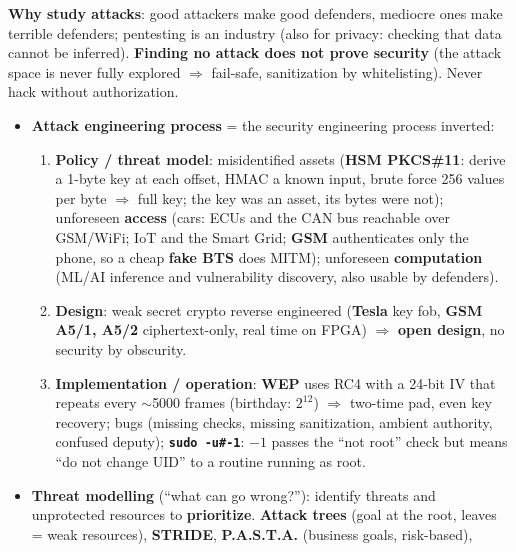 \begin{recapbox}[title={Exam-ready recap --- Lecture 8: Adversarial thinking I}]
\textbf{Why study attacks}: good attackers make good defenders, mediocre ones make terrible
defenders; pentesting is an industry (also for privacy: checking that data cannot be inferred).
\textbf{Finding no attack does not prove security} (the attack space is never fully explored
$\Rightarrow$ fail-safe, sanitization by whitelisting). Never hack without authorization.
\begin{itemize}
  \item \textbf{Attack engineering process} = the security engineering process inverted:
        \begin{enumerate}
          \item \textbf{Policy / threat model}: misidentified assets (\textbf{HSM PKCS\#11}: derive
                a 1-byte key at each offset, HMAC a known input, brute force 256 values per byte
                $\Rightarrow$ full key; the key was an asset, its bytes were not); unforeseen
                \textbf{access} (cars: ECUs and the CAN bus reachable over GSM/WiFi; IoT and the
                Smart Grid; \textbf{GSM} authenticates only the phone, so a cheap \textbf{fake
                BTS} does MITM); unforeseen \textbf{computation} (ML/AI inference and vulnerability
                discovery, also usable by defenders).
          \item \textbf{Design}: weak secret crypto reverse engineered (\textbf{Tesla} key fob,
                \textbf{GSM A5/1, A5/2} ciphertext-only, real time on FPGA) $\Rightarrow$
                \textbf{open design}, no security by obscurity.
          \item \textbf{Implementation / operation}: \textbf{WEP} uses RC4 with a 24-bit IV that
                repeats every $\sim$5000 frames (birthday: $2^{12}$) $\Rightarrow$ two-time pad,
                even key recovery; bugs (missing checks, missing sanitization, ambient authority,
                confused deputy); \textbf{\texttt{sudo -u\#-1}}: $-1$ passes the ``not root''
                check but means ``do not change UID'' to a routine running as root.
        \end{enumerate}
  \item \textbf{Threat modelling} (``what can go wrong?''): identify threats and unprotected
        resources to \textbf{prioritize}. \textbf{Attack trees} (goal at the root, leaves = weak
        resources), \textbf{STRIDE}, \textbf{P.A.S.T.A.} (business goals, risk-based),

\end{itemize}
\end{recapbox}
